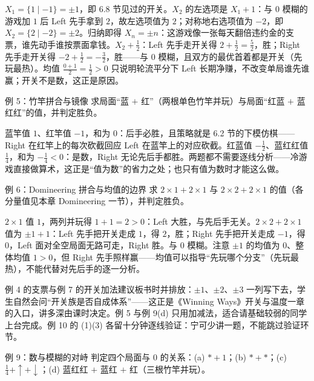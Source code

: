 \sol $X_1=\{1\mid -1\}=\pm1$，即 6.8 节见过的开关。$X_2$ 的左选项是 $X_1+1$：与 $0$ 模糊的游戏加 $1$ 后 Left 先手拿到 $2$，故左选项值为 $2$；对称地右选项值为 $-2$，即 $X_2=\{2\mid -2\}=\pm2$。归纳即得 $X_n=\pm n$：这游戏像一张每天翻倍违约金的支票，谁先动手谁按票面拿钱。$X_2+\tfrac12$：Left 先手走开关得 $2+\tfrac12=\tfrac52$，胜；Right 先手走开关得 $-2+\tfrac12=-\tfrac32$，胜——与 $0$ 模糊，且双方的最优首着都是开关（先玩最热）。均值 $\tfrac{0+1}{2}=\tfrac12>0$ 只说明轮流平分下 Left 长期净赚，不改变单局谁先谁赢；开关不是数，这正是原因。

\begin{problem}{例 5：竹竿拼合与镜像}
求局面“蓝 $+$ 红”（两根单色竹竿并玩）与局面“红蓝 $+$ 蓝红红”的值，并判定胜负。
\end{problem}

\sol 蓝竿值 $1$、红竿值 $-1$，和为 $0$：后手必胜，且策略就是 6.2 节的下模仿棋——Right 在红竿上的每次砍截回应 Left 在蓝竿上的对应砍截。红蓝值 $-\tfrac12$、蓝红红值 $\tfrac14$，和为 $-\tfrac14<0$：是数，Right 无论先后手都胜。两题都不需要逐线分析——冷游戏直接做算术，这正是“值为数”的省力之处；也只有值为数时才能这么做。

\begin{problem}{例 6：Domineering 拼合与均值的边界}
求 $2\times1+2\times1$ 与 $2\times2+2\times1$ 的值（各分量值见本章 Domineering 一节），并判定胜负。
\end{problem}

\sol $2\times1$ 值 $1$，两列并玩得 $1+1=2>0$：Left 大胜，与先后手无关。$2\times2+2\times1$ 值为 $\pm1+1$：Left 先手把开关走成 $1$，得 $2$，胜；Right 先手把开关走成 $-1$，得 $0$，Left 面对全空局面无路可走，Right 胜。与 $0$ 模糊。注意 $\pm1$ 的均值为 $0$、整体均值 $1>0$，但 Right 先手照样赢——均值可以指导“先玩哪个分支”（先玩最热），不能代替对先后手的逐一分析。

\begin{teach}[ch6 例题节讲评建议]
例 4 的支票与例 7 的开关加法建议板书时并排放：$\pm1$、$\pm2$、$\pm3$ 一列写下去，学生自然会问“开关族是否自成体系”——这正是《Winning Ways》开关与温度一章的入口，讲多深由课时决定。例 5 与例 9(d) 只用加减法，适合请基础较弱的同学上台完成。例 10 的 (1)(3) 各留十分钟逐线验证：宁可少讲一题，不能跳过验证环节。
\end{teach}

\begin{problem}{例 9：数与模糊的对峙}
判定四个局面与 $0$ 的关系：(a) $\ast+1$；(b) $\ast+\ast$；(c) $\tfrac14+\uparrow+\downarrow$；(d) 蓝红红 $+$ 蓝红 $+$ 红（三根竹竿并玩）。
\end{problem}

